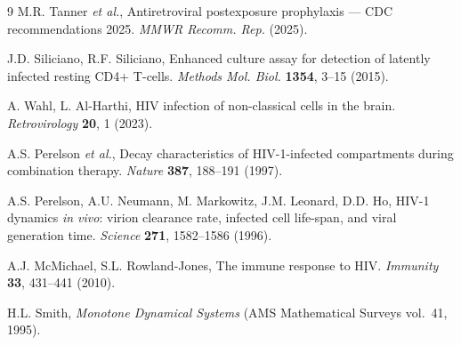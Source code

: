 \documentclass[11pt]{article}
\theoremstyle{definition}
\theoremstyle{remark}
\begin{document}
\begin{thebibliography}{9}
M.R. Tanner \textit{et al.}, Antiretroviral postexposure prophylaxis --- CDC recommendations 2025. \textit{MMWR Recomm. Rep.} (2025).

J.D. Siliciano, R.F. Siliciano, Enhanced culture assay for detection of latently infected resting CD4+ T-cells. \textit{Methods Mol. Biol.} \textbf{1354}, 3--15 (2015).

A. Wahl, L. Al-Harthi, HIV infection of non-classical cells in the brain. \textit{Retrovirology} \textbf{20}, 1 (2023).

A.S. Perelson \textit{et al.}, Decay characteristics of HIV-1-infected compartments during combination therapy. \textit{Nature} \textbf{387}, 188--191 (1997).

A.S. Perelson, A.U. Neumann, M. Markowitz, J.M. Leonard, D.D. Ho, HIV-1 dynamics \textit{in vivo}: virion clearance rate, infected cell life-span, and viral generation time. \textit{Science} \textbf{271}, 1582--1586 (1996).

A.J. McMichael, S.L. Rowland-Jones, The immune response to HIV. \textit{Immunity} \textbf{33}, 431--441 (2010).

H.L. Smith, \textit{Monotone Dynamical Systems} (AMS Mathematical Surveys vol.~41, 1995).
\end{thebibliography}
\end{document}
